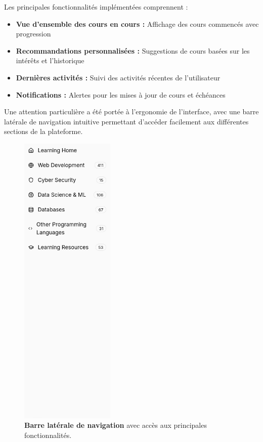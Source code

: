 Les principales fonctionnalités implémentées comprennent :
\begin{itemize}
  \item \textbf{Vue d'ensemble des cours en cours :} Affichage des cours commencés avec progression
  \item \textbf{Recommandations personnalisées :} Suggestions de cours basées sur les intérêts et l'historique
  \item \textbf{Dernières activités :} Suivi des activités récentes de l'utilisateur
  \item \textbf{Notifications :} Alertes pour les mises à jour de cours et échéances
\end{itemize}

Une attention particulière a été portée à l'ergonomie de l'interface, avec une barre latérale de navigation intuitive permettant d'accéder facilement aux différentes sections de la plateforme.

\begin{figure}[h!]
  \centering
  \includegraphics[width=0.4\textwidth,keepaspectratio]{week_3_img/sidebare.png}
  \caption{\textbf{Barre latérale de navigation} avec accès aux principales fonctionnalités.}
  \label{fig:sidebar}
\end{figure}

